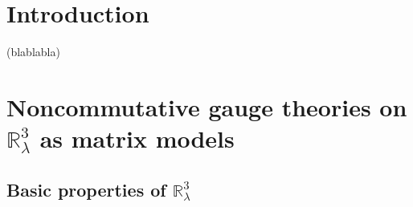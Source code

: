 \documentclass[a4paper,11pt,twoside]{article}
\numberwithin{equation}{section}
\theoremstyle{nonumberplain}
\begin{document}
\section{Introduction}

%
%

(blablabla)


\section{\texorpdfstring{Noncommutative gauge theories on $\mathbb{R}^3_\lambda$ as matrix models}{Matrix gauge models}} \label{section2}

\subsection{\texorpdfstring{Basic properties of $\mathbb{R}^3_\lambda$}{R3l}}\label{subsection21}
\end{document}
